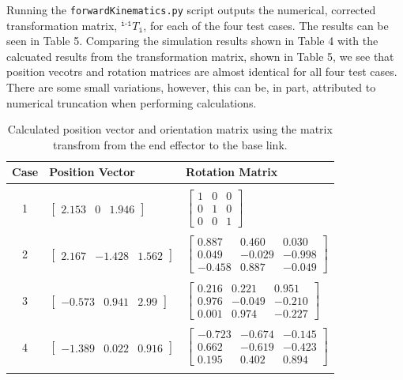 \documentclass[a4paper]{article}
\begin{document}
Running the \verb|forwardKinematics.py| script outputs the numerical, corrected transformation matrix, $^{\texttt{i-1}} T_{\texttt{i}}$, for each of the four test cases. The results can be seen in Table 5. Comparing the simulation results shown in Table 4 with the calcuated results from the transformation matrix, shown in Table 5, we see that position vecotrs and rotation matrices are almost identical for all four test cases. There are some small variations, however, this can be, in part, attributed to numerical truncation when performing calculations. 

\begin{table}[h]
	\centering
	\caption{Calculated position vector and orientation matrix using the matrix transfrom from the end effector to the base link.}
	\begin{tabular}{cll}
		\toprule
		\textbf{Case} & \textbf{Position Vector} & \textbf{Rotation Matrix}\\
		\midrule
		& & \\
		1 & $\begin{bmatrix}2.153 & 0 & 1.946\end{bmatrix}$ & $\begin{bmatrix}1 & 0 & 0\\0 & 1 & 0\\0 & 0 & 1\end{bmatrix}$\\
		& & \\
		2 & $\begin{bmatrix}2.167 & -1.428 & 1.562\end{bmatrix}$ & $\begin{bmatrix}0.887 & 0.460 & 0.030\\0.049 & -0.029 & -0.998\\-0.458 & 0.887 & -0.049\end{bmatrix}$\\
		& & \\
		3 & $\begin{bmatrix}-0.573 & 0.941 & 2.99\end{bmatrix}$ & $\begin{bmatrix}0.216 & 0.221 & 0.951\\0.976 & -0.049 & -0.210\\0.001 & 0.974 & -0.227\end{bmatrix}$\\
		& & \\
		4 & $\begin{bmatrix}-1.389 & 0.022 & 0.916\end{bmatrix}$ & $\begin{bmatrix}-0.723 & -0.674 & -0.145\\0.662 & -0.619 & -0.423\\0.195 & 0.402 & 0.894\end{bmatrix}$\\
		& & \\
		\bottomrule
	\end{tabular}
\end{table}
\end{document}
